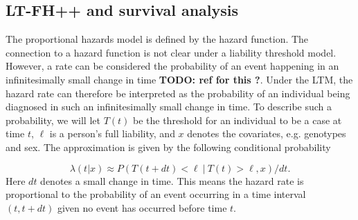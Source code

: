 %

\subsection{LT-FH++ and survival analysis}
The proportional hazards model is defined by the hazard function. The connection to a hazard function is not clear under a liability 
threshold model. However, a rate can be considered the probability of an event happening in an infinitesimally small change in time 
\textbf{TODO: ref for this ?}. Under the LTM, the hazard rate can therefore be interpreted as the probability of an individual being 
diagnosed in such an infinitesimally small change in time\cite{kragh2021analysis}. To describe such a probability, we will let $ T(t) 
$ be the threshold for an individual to be a case at time $ t $, $ \ell $ is a person's full liability, and $ x $ denotes the 
covariates, e.g. genotypes and sex. The approximation is given by the following conditional probability

\begin{equation}\label{eq:ltm_case_prob_approx}
	\lambda(t|x) \approx 
	P\left(T(t + dt) < \ell ~|~ T(t) > \ell, x \right) / dt.
\end{equation}
Here $ dt $ denotes a small change in time. This means the hazard rate is proportional to the probability of an event occurring in a time interval $ (t, t + dt) $ given no event has occurred before time $ t $.

